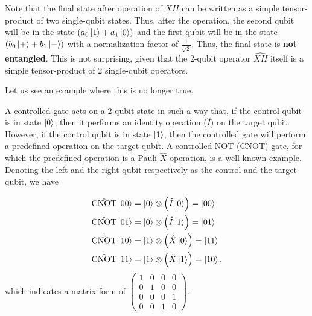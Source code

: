 \documentclass[12pt,oneside]{book}
\begin{document}
Note that the final state after operation of $\hat{XH}$ can be written as a simple tensor-product of two single-qubit states. Thus, after the operation, the second qubit will be in the state $\left(a_0\ket{1}+a_1\ket{0}\right)$ and the first qubit will be in the state $\left(b_0\ket{+}+b_1\ket{-}\right)$ with a normalization factor of $\frac{1}{\sqrt{2}}$. Thus, the final state is \textbf{not entangled}. This is not surprising, given that the 2-qubit operator $\hat{XH}$ itself is a simple tensor-product of 2 single-qubit operators.

Let us see an example where this is no longer true. 

A controlled gate acts on a 2-qubit state in such a way that, if the control qubit is in state $\ket{0}$, then it performs an identity operation ($\hat{I}$) on the target qubit. However, if the control qubit is in state $\ket{1}$, then the controlled gate will perform a predefined operation on the target qubit. A controlled NOT (CNOT) gate, for which the predefined operation is a Pauli $\hat{X}$ operation, is a well-known example. Denoting the left and the right qubit respectively as the control and the target qubit, we have

\begin{align*}
    \hat{\mathrm{CNOT}}\ket{00} &{}= \ket{0} \otimes \left(\hat{I}\ket{0}\right)= \ket{00}\\
    \hat{\mathrm{CNOT}}\ket{01} &{}= \ket{0} \otimes \left(\hat{I}\ket{1}\right) = \ket{01}\\
    \hat{\mathrm{CNOT}}\ket{10} &{}= \ket{1} \otimes \left(\hat{X}\ket{0}\right) = \ket{11}\\
    \hat{\mathrm{CNOT}}\ket{11} &{}=  \ket{1} \otimes \left(\hat{X}\ket{1}\right) = \ket{10},\\
\end{align*}
which indicates a matrix form of $\begin{pmatrix}
    1 & 0 & 0 & 0\\ 0 & 1 & 0 & 0\\0 & 0 & 0 & 1\\ 0 & 0 & 1 & 0
\end{pmatrix}$.
\end{document}
